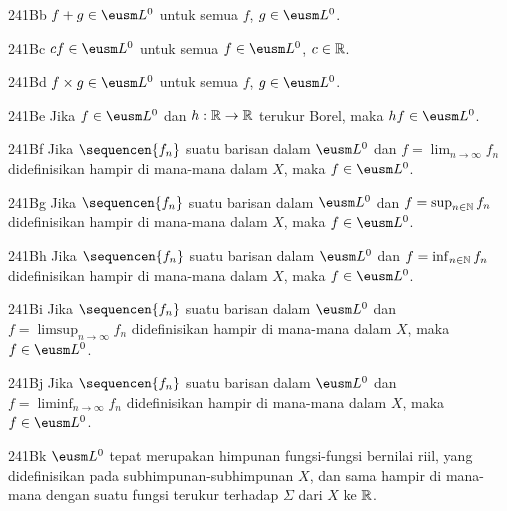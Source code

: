 \spheader 241Bb $f+g\in\eusm L^0$ untuk semua $f$,
$g\in\eusm L^0$.

\spheader 241Bc $cf\in\eusm L^0$ untuk semua $f\in\eusm L^0$,
$c\in\Bbb R$.

\spheader 241Bd $f\times g\in\eusm L^0$ untuk semua $f$,
$g\in\eusm L^0$.

\spheader 241Be Jika $f\in\eusm L^0$ dan $h:\Bbb R\to\Bbb R$ terukur
Borel, maka $hf\in\eusm L^0$.

\spheader 241Bf Jika $\sequencen{f_n}$ suatu barisan dalam $\eusm L^0$
dan $f=\lim_{n\to\infty}f_n$ didefinisikan hampir di mana-mana dalam $X$, maka
$f\in\eusm L^0$.

\spheader 241Bg Jika $\sequencen{f_n}$ suatu barisan dalam $\eusm L^0$
dan $f=\sup_{n\in\Bbb N}f_n$ didefinisikan hampir di mana-mana dalam $X$, maka
$f\in\eusm L^0$.

\spheader 241Bh Jika $\sequencen{f_n}$ suatu barisan dalam $\eusm L^0$
dan $f=\inf_{n\in\Bbb N}f_n$ didefinisikan hampir di mana-mana dalam $X$, maka
$f\in\eusm L^0$.

\spheader 241Bi Jika $\sequencen{f_n}$ suatu barisan dalam $\eusm L^0$
dan $f=\limsup_{n\to\infty}f_n$ didefinisikan hampir di mana-mana dalam $X$, maka
$f\in\eusm L^0$.

\spheader 241Bj Jika $\sequencen{f_n}$ suatu barisan dalam $\eusm L^0$
dan $f=\liminf_{n\to\infty}f_n$ didefinisikan hampir di mana-mana dalam $X$, maka
$f\in\eusm L^0$.

\spheader 241Bk $\eusm L^0$ tepat merupakan himpunan fungsi-fungsi
bernilai riil, yang didefinisikan pada subhimpunan-subhimpunan $X$, dan
sama hampir di mana-mana dengan suatu fungsi terukur terhadap $\Sigma$ dari
$X$ ke $\Bbb R$.

